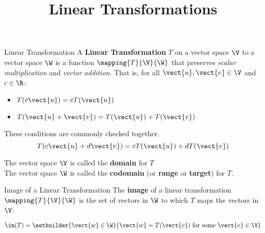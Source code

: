 \documentclass{beamer}
\title[MATH 2250 - Section 5.1]{Linear Transformations}
\begin{document}
\begin{frame}
  \titlepage
\end{frame}

\begin{frame}
\begin{block}{Linear Transformation}
A \textbf{Linear Transformation} $T$ on a vector space $\V$ to a vector space $\W$ is a function $\mapping{T}{\V}{\W}$ that preserves \emph{scalar multiplication} and \emph{vector addition}. That is, for all $\vect{u}, \vect{v}\in\V$ and $c\in\R$:
\begin{itemize}
\item $T (c\vect{u})=cT (\vect{u})$
\item $T (\vect{u}+\vect{v})=T (\vect{u})+T (\vect{v})$
\end{itemize}\pause
These conditions are commonly checked together.
\begin{equation*}
T(c\vect{u}+d\vect{v})=cT(\vect{u})+dT(\vect{v})
\end{equation*}
\end{block}\pause
\begin{block}{}
The vector space $\V$ is called the \textbf{domain} for $T$\\
The vector space $\W$ is called the \textbf{codomain} (or \textbf{range} or \textbf{target}) for $T$.
\end{block}\pause
\begin{block}{Image of a Linear Transformation}
The \textbf{image} of a linear transformation $\mapping{T}{\V}{\W}$ is the set of vectors in $\W$ to which $T$ maps the vectors in $\V$:

\vspace{-4mm}
\begin{equation*}
\im(T) = \setbuilder{\vect{w}\in\W}{\vect{w}=T(\vect{v})\text{ for some } \vect{v}\in\V}
\end{equation*}
\end{block}
\end{frame}
\end{document}
